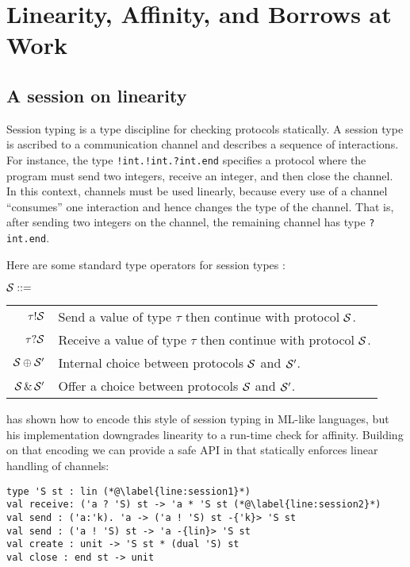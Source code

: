\section{Linearity, Affinity, and Borrows at Work}


\subsection{A session on linearity}

Session typing \cite{Honda1993,DBLP:conf/esop/HondaVK98} is a type
discipline for checking protocols statically. A session type is
ascribed to a communication channel and describes
a sequence of interactions. For instance, the type
\lstinline{!int.!int.?int.end} specifies a protocol
where the program must send two integers, receive an integer, and then
close the channel. 
%
In this context, channels must be used linearly, because every use of
a channel ``consumes'' one interaction and hence changes the type of the
channel. That is, after sending two integers on the channel,
the remaining channel has type \lstinline{?int.end}.

Here are some standard type operators for session types \SType:
\begin{center}
  $\mathcal S ::=$
  \begin{tabular}[t]{rl}
    $\tau ! \mathcal S$ & Send a value of type $\tau$ then continue with protocol $\mathcal S$.\\
    $\tau ? \mathcal S$& Receive a value of type $\tau$ then continue with protocol $\mathcal S$.\\
    $\mathcal S \oplus \mathcal S'$& Internal choice between protocols $\mathcal S$ and $\mathcal S'$.\\
    $\mathcal S \operatorname{\&} \mathcal S'$
                    & Offer a choice between protocols $\mathcal S$ and $\mathcal S'$. 
  \end{tabular}
\end{center}

\citet{DBLP:journals/jfp/Padovani17}  has shown how to encode this
style of session typing in ML-like languages, but his implementation
downgrades linearity to a run-time check for affinity. Building on that
encoding we can provide a safe API in \lang that statically enforces
linear handling of channels:
%
\begin{lstlisting}
type 'S st : lin (*@\label{line:session1}*)
val receive: ('a ? 'S) st -> 'a * 'S st (*@\label{line:session2}*)
val send : ('a:'k). 'a -> ('a ! 'S) st -{'k}> 'S st
val send : ('a ! 'S) st -> 'a -{lin}> 'S st
val create : unit -> 'S st * (dual 'S) st
val close : end st -> unit
\end{lstlisting}

